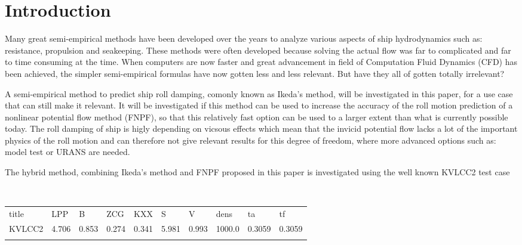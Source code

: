 \section{Introduction}\label{introduction}

Many great semi-empirical methods have been developed over the years to
analyze various aspects of ship hydrodynamics such as: resistance,
propulsion and seakeeping. These methods were often developed because
solving the actual flow was far to complicated and far to time consuming
at the time. When computers are now faster and great advancement in
field of Computation Fluid Dynamics (CFD) has been achieved, the simpler
semi-empirical formulas have now gotten less and less relevant. But have
they all of gotten totally irrelevant?

A semi-empirical method to predict ship roll damping, comonly known as
Ikeda's method, will be investigated in this paper, for a use case that
can still make it relevant. It will be investigated if this method can
be used to increase the accuracy of the roll motion prediction of a
nonlinear potential flow method (FNPF), so that this relatively fast
option can be used to a larger extent than what is currently possible
today. The roll damping of ship is higly depending on vicsous effects
which mean that the invicid potential flow lacks a lot of the important
physics of the roll motion and can therefore not give relevant results
for this degree of freedom, where more advanced options such as: model
test or URANS are needed.

The hybrid method, combining Ikeda's method and FNPF proposed in this
paper is investigated using the well known KVLCC2 test case
 
            
    
    \begin{center}
    \end{center}
    { \hspace*{\fill} \\}
    
 
            
    
    \begin{longtable}[c]{@{}llllllllll@{}}
\toprule\addlinespace
title & LPP & B & ZCG & KXX & S & V & dens & ta & tf\\\addlinespace 
\midrule\endhead
KVLCC2 & 4.706 & 0.853 & 0.274 & 0.341 & 5.981 & 0.993 & 1000.0 & 0.3059 & 0.3059\\\addlinespace 
\bottomrule 
 \end{longtable}


